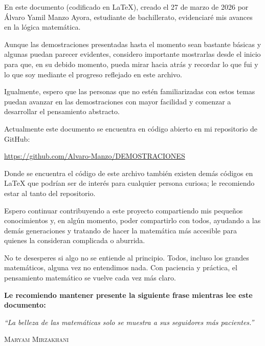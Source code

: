 \documentclass[12pt,final]{report}
\theoremstyle{plain}
\theoremstyle{definition}
\begin{document}
En este documento (codificado en \LaTeX), creado el 27 de marzo de 2026 por Álvaro Yamil Manzo Ayora, estudiante de bachillerato, evidenciaré mis avances en la lógica matemática.

Aunque las demostraciones presentadas hasta el momento sean bastante básicas y algunas puedan parecer evidentes, considero importante mostrarlas desde el inicio para que, en su debido momento, pueda mirar hacia atrás y recordar lo que fui y lo que soy mediante el progreso reflejado en este archivo.

Igualmente, espero que las personas que no estén familiarizadas con estos temas puedan avanzar en las demostraciones con mayor facilidad y comenzar a desarrollar el pensamiento abstracto.

Actualmente este documento se encuentra en código abierto en mi repositorio de GitHub:

\begin{center}

\url{https://github.com/Alvaro-Manzo/DEMOSTRACIONES}

\end{center}

Donde se encuentra el código de este archivo también existen demás códigos en LaTeX que podrían ser de interés para cualquier persona curiosa; le recomiendo estar al tanto del repositorio.

Espero continuar contribuyendo a este proyecto compartiendo mis pequeños conocimientos y, en algún momento, poder compartirlo con todos, ayudando a las demás generaciones y tratando de hacer la matemática más accesible para quienes la consideran complicada o aburrida.

No te desesperes si algo no se entiende al principio. Todos, incluso los grandes matemáticos, alguna vez no entendimos nada. Con paciencia y práctica, el pensamiento matemático se vuelve cada vez más claro.

\vspace{1.5em}

\begin{center}

\textbf{Le recomiendo mantener presente la siguiente frase mientras lee este documento:}

\vspace{1em}

\textit{``La belleza de las matemáticas solo se muestra a sus seguidores más pacientes.''}

\textsc{Maryam Mirzakhani}

\end{center}
\end{document}
